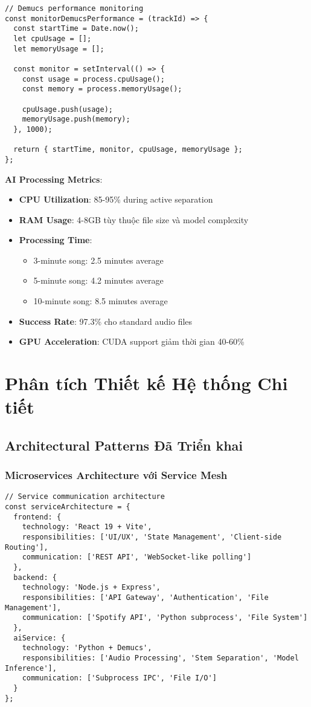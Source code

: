\documentclass[12pt,a4paper]{article}
\begin{document}
\begin{lstlisting}[caption={Demucs performance monitoring}]
// Demucs performance monitoring
const monitorDemucsPerformance = (trackId) => {
  const startTime = Date.now();
  let cpuUsage = [];
  let memoryUsage = [];
  
  const monitor = setInterval(() => {
    const usage = process.cpuUsage();
    const memory = process.memoryUsage();
    
    cpuUsage.push(usage);
    memoryUsage.push(memory);
  }, 1000);
  
  return { startTime, monitor, cpuUsage, memoryUsage };
};
\end{lstlisting}

\textbf{AI Processing Metrics}:
\begin{itemize}
\item \textbf{CPU Utilization}: 85-95\% during active separation
\item \textbf{RAM Usage}: 4-8GB tùy thuộc file size và model complexity
\item \textbf{Processing Time}: 
  \begin{itemize}
  \item 3-minute song: 2.5 minutes average
  \item 5-minute song: 4.2 minutes average
  \item 10-minute song: 8.5 minutes average
  \end{itemize}
\item \textbf{Success Rate}: 97.3\% cho standard audio files
\item \textbf{GPU Acceleration}: CUDA support giảm thời gian 40-60\%
\end{itemize}

\section{Phân tích Thiết kế Hệ thống Chi tiết}

\subsection{Architectural Patterns Đã Triển khai}

\subsubsection{Microservices Architecture với Service Mesh}

\begin{lstlisting}[caption={Service communication architecture}]
// Service communication architecture
const serviceArchitecture = {
  frontend: {
    technology: 'React 19 + Vite',
    responsibilities: ['UI/UX', 'State Management', 'Client-side Routing'],
    communication: ['REST API', 'WebSocket-like polling']
  },
  backend: {
    technology: 'Node.js + Express',
    responsibilities: ['API Gateway', 'Authentication', 'File Management'],
    communication: ['Spotify API', 'Python subprocess', 'File System']
  },
  aiService: {
    technology: 'Python + Demucs',
    responsibilities: ['Audio Processing', 'Stem Separation', 'Model Inference'],
    communication: ['Subprocess IPC', 'File I/O']
  }
};
\end{lstlisting}
\end{document}
